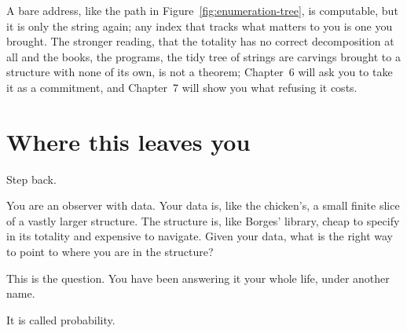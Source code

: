 A bare address, like the path in Figure~\ref{fig:enumeration-tree}, is computable, but it is only the string again; any index that tracks what matters to you is one you brought. The stronger reading, that the totality has no correct decomposition at all and the books, the programs, the tidy tree of strings are carvings brought to a structure with none of its own, is not a theorem; Chapter~6 will ask you to take it as a commitment, and Chapter~7 will show you what refusing it costs.

\section*{Where this leaves you}

Step back.

You are an observer with data. Your data is, like the chicken's, a small finite slice of a vastly larger structure. The structure is, like Borges' library, cheap to specify in its totality and expensive to navigate. Given your data, what is the right way to point to where you are in the structure?

This is the question. You have been answering it your whole life, under another name.

It is called probability.
